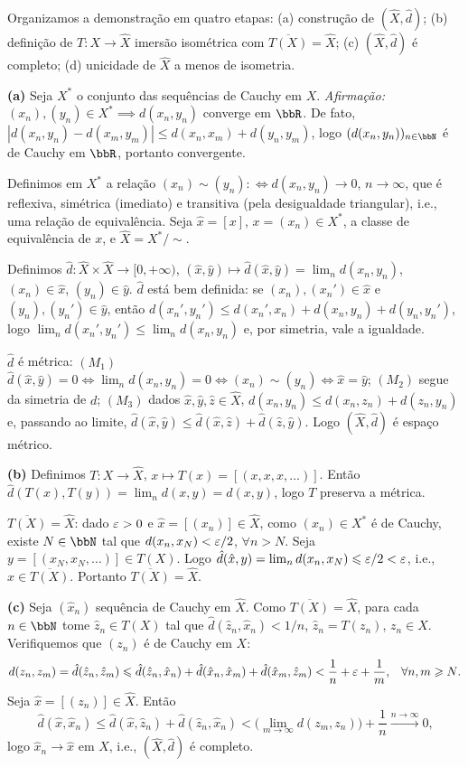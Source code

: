 \begin{myproof}
	Organizamos a demonstração em quatro etapas: (a) construção de $(\hat X,\hat d)$; (b) definição de
	$T:X\to\hat X$ imersão isométrica com $\overline{T(X)}=\hat X$; (c) $(\hat X,\hat d)$ é completo; (d)
	unicidade de $\hat X$ a menos de isometria.

	\textbf{(a)} Seja $X^*$ o conjunto das sequências de Cauchy em $X$. \textit{Afirmação:}
	$(x_n),(y_n)\in X^* \implies d(x_n,y_n)$ converge em $\bbR$. De fato,
	$|d(x_n,y_n)-d(x_m,y_m)|\leq d(x_n,x_m)+d(y_n,y_m)$, logo $(d(x_n,y_n))_{n\in\bbN}$ é de Cauchy em
	$\bbR$, portanto convergente.

	Definimos em $X^*$ a relação $(x_n)\sim(y_n) :\iff d(x_n,y_n)\to 0$, $n\to\infty$, que é reflexiva,
	simétrica (imediato) e transitiva (pela desigualdade triangular), i.e., uma relação de equivalência.
	Seja $\hat x=[x]$, $x=(x_n)\in X^*$, a classe de equivalência de $x$, e $\hat X=X^*/\!\sim$.

	Definimos $\hat d:\hat X\times\hat X\to[0,+\infty)$, $(\hat x,\hat y)\mapsto \hat
	d(\hat x,\hat y)=\lim_n d(x_n,y_n)$, $(x_n)\in\hat x$, $(y_n)\in\hat y$. $\hat d$ está bem definida:
	se $(x_n),(x_n')\in\hat x$ e $(y_n),(y_n')\in\hat y$, então
	$d(x_n',y_n')\leq d(x_n',x_n)+d(x_n,y_n)+d(y_n,y_n')$, logo $\lim_n d(x_n',y_n')\leq \lim_n
	d(x_n,y_n)$ e, por simetria, vale a igualdade.

	$\hat d$ é métrica: $(M_1)$ $\hat d(\hat x,\hat y)=0 \iff \lim_n d(x_n,y_n)=0 \iff (x_n)\sim(y_n) \iff
	\hat x=\hat y$; $(M_2)$ segue da simetria de $d$; $(M_3)$ dados $\hat x,\hat y,\hat z\in\hat X$,
	$d(x_n,y_n)\leq d(x_n,z_n)+d(z_n,y_n)$ e, passando ao limite, $\hat d(\hat x,\hat y)\leq \hat
	d(\hat x,\hat z)+\hat d(\hat z,\hat y)$. Logo $(\hat X,\hat d)$ é espaço métrico.

	\textbf{(b)} Definimos $T:X\to\hat X$, $x\mapsto T(x)=[(x,x,x,\dots)]$. Então
	$\hat d(T(x),T(y))=\lim_n d(x,y)=d(x,y)$, logo $T$ preserva a métrica.

	$\overline{T(X)}=\hat X$: dado $\varepsilon>0$ e $\hat x=[(x_n)]\in\hat X$, como $(x_n)\in X^*$ é de Cauchy,
	existe $N\in\bbN$ tal que $d(x_n,x_N)<\varepsilon/2$, $\forall n>N$. Seja $y=[(x_N,x_N,\dots)]\in T(X)$. Logo
	$\hat d(\hat x,y)=\lim_n d(x_n,x_N)\leqslant \varepsilon/2<\varepsilon$, i.e., $\hat x\in\overline{T(X)}$. Portanto
	$\overline{T(X)}=\hat X$.

	\textbf{(c)} Seja $(\hat x_n)$ sequência de Cauchy em $\hat X$. Como $\overline{T(X)}=\hat X$, para
	cada $n\in\bbN$ tome $\hat z_n\in T(X)$ tal que $\hat d(\hat z_n,\hat x_n)<1/n$, $\hat z_n=T(z_n)$,
	$z_n\in X$. Verifiquemos que $(z_n)$ é de Cauchy em $X$:
	$$d(z_n,z_m)=\hat d(\hat z_n,\hat z_m)\leqslant \hat d(\hat z_n,\hat x_n)+\hat d(\hat x_n,\hat x_m)+\hat
	d(\hat x_m,\hat z_m) < \frac1n+\varepsilon+\frac1m\text{,}\quad \forall n,m\geqslant N\text{.}$$
	Seja $\hat x=[(z_n)]\in\hat X$. Então
	$$\hat d(\hat x,\hat x_n)\leq \hat d(\hat x,\hat z_n)+\hat d(\hat z_n,\hat x_n) < \Big(\lim_{m\to\infty}d(z_m,z_n)\Big)+\frac1n \xrightarrow{n\to\infty}0\text{,}$$
	logo $\hat x_n\to\hat x$ em $\hat X$, i.e., $(\hat X,\hat d)$ é completo.


\end{myproof}
